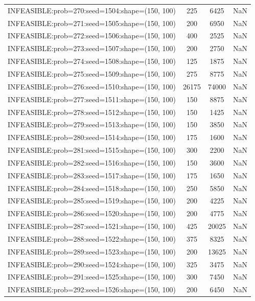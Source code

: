 \begin{longtable}{lccc}
INFEASIBLE:prob=270:seed=1504:shape=(150, 100) &      225 &  6425 &    NaN \\
INFEASIBLE:prob=271:seed=1505:shape=(150, 100) &      200 &  6950 &    NaN \\
INFEASIBLE:prob=272:seed=1506:shape=(150, 100) &      400 &  2525 &    NaN \\
INFEASIBLE:prob=273:seed=1507:shape=(150, 100) &      200 &  2750 &    NaN \\
INFEASIBLE:prob=274:seed=1508:shape=(150, 100) &      125 &  1875 &    NaN \\
INFEASIBLE:prob=275:seed=1509:shape=(150, 100) &      275 &  8775 &    NaN \\
INFEASIBLE:prob=276:seed=1510:shape=(150, 100) &    26175 & 74000 &    NaN \\
INFEASIBLE:prob=277:seed=1511:shape=(150, 100) &      150 &  8875 &    NaN \\
INFEASIBLE:prob=278:seed=1512:shape=(150, 100) &      150 &  1425 &    NaN \\
INFEASIBLE:prob=279:seed=1513:shape=(150, 100) &      150 &  3850 &    NaN \\
INFEASIBLE:prob=280:seed=1514:shape=(150, 100) &      175 &  1600 &    NaN \\
INFEASIBLE:prob=281:seed=1515:shape=(150, 100) &      300 &  2200 &    NaN \\
INFEASIBLE:prob=282:seed=1516:shape=(150, 100) &      150 &  3600 &    NaN \\
INFEASIBLE:prob=283:seed=1517:shape=(150, 100) &      175 &  1650 &    NaN \\
INFEASIBLE:prob=284:seed=1518:shape=(150, 100) &      250 &  5850 &    NaN \\
INFEASIBLE:prob=285:seed=1519:shape=(150, 100) &      200 &  4225 &    NaN \\
INFEASIBLE:prob=286:seed=1520:shape=(150, 100) &      200 &  4775 &    NaN \\
INFEASIBLE:prob=287:seed=1521:shape=(150, 100) &      425 & 20025 &    NaN \\
INFEASIBLE:prob=288:seed=1522:shape=(150, 100) &      375 &  8325 &    NaN \\
INFEASIBLE:prob=289:seed=1523:shape=(150, 100) &      200 & 13625 &    NaN \\
INFEASIBLE:prob=290:seed=1524:shape=(150, 100) &      325 &  3475 &    NaN \\
INFEASIBLE:prob=291:seed=1525:shape=(150, 100) &      300 &  7450 &    NaN \\
INFEASIBLE:prob=292:seed=1526:shape=(150, 100) &      200 &  6450 &    NaN \\

\end{longtable}
